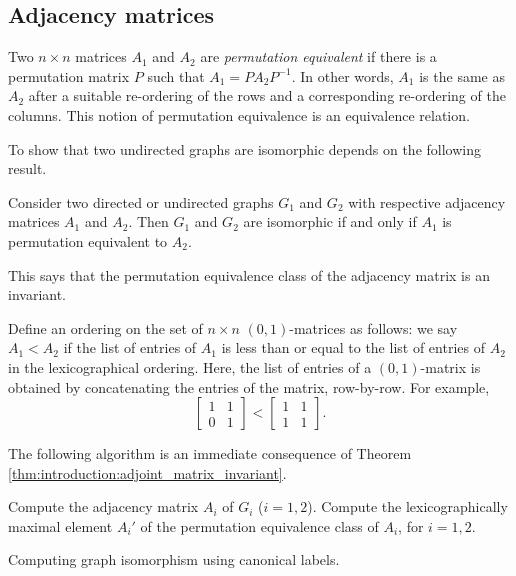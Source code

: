 
\subsection{Adjacency matrices}

Two $n \times n$ matrices $A_1$ and $A_2$ are
\emph{permutation equivalent} if there is a permutation matrix $P$
such that $A_1 = P A_2 P^{-1}$. In other words, $A_1$ is the same as
$A_2$ after a suitable re-ordering of the rows and a corresponding
re-ordering of the columns. This notion of permutation equivalence is
an equivalence relation.

To show that two undirected graphs are isomorphic depends on the
following result.

\begin{theorem}
\label{thm:introduction:adjoint_matrix_invariant}
Consider two directed or undirected graphs $G_1$ and $G_2$ with
respective adjacency matrices $A_1$ and $A_2$. Then $G_1$ and $G_2$
are isomorphic if and only if $A_1$ is permutation equivalent to
$A_2$.
\end{theorem}

This says that the permutation equivalence class of the adjacency
matrix is an invariant.

Define an ordering on the set of $n \times n$ $(0, 1)$-matrices as
follows: we say $A_1 < A_2$ if the list of entries of $A_1$ is less
than or equal to the list of entries of $A_2$ in the lexicographical
ordering. Here, the list of entries of a $(0, 1)$-matrix is obtained
by concatenating the entries of the matrix, row-by-row. For example,
\[
\begin{bmatrix}
1 & 1 \\
0 & 1
\end{bmatrix}
<
\begin{bmatrix}
1 & 1 \\
1 & 1
\end{bmatrix}.
\]

The following algorithm is an immediate consequence of
Theorem \ref{thm:introduction:adjoint_matrix_invariant}.

\begin{algorithm}[!htpb]
\dontprintsemicolon  %
\BlankLine
Compute the adjacency matrix $A_i$ of $G_i$ ($i = 1, 2$).\;
Compute the lexicographically maximal element $A_i'$ of the
permutation equivalence class of $A_i$, for $i = 1, 2$.\;
\caption{Computing graph isomorphism using canonical labels.}
\label{alg:introduction:graph_isomorphism_canonical_labels}
\end{algorithm}

